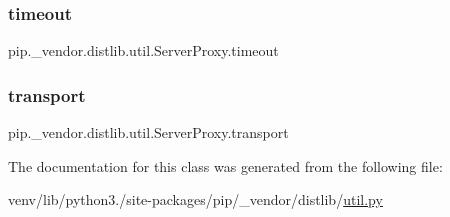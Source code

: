 \subsubsection{\texorpdfstring{timeout}{timeout}}
{\footnotesize\ttfamily pip.\+\_\+vendor.\+distlib.\+util.\+Server\+Proxy.\+timeout}

\mbox{\label{classpip_1_1__vendor_1_1distlib_1_1util_1_1ServerProxy_af8ac17e20f056286f66841bdd371190e}} 
\subsubsection{\texorpdfstring{transport}{transport}}
{\footnotesize\ttfamily pip.\+\_\+vendor.\+distlib.\+util.\+Server\+Proxy.\+transport}



The documentation for this class was generated from the following file\+:\begin{DoxyCompactItemize}
\item 
venv/lib/python3./site-\/packages/pip/\+\_\+vendor/distlib/\hyperlink{pip_2__vendor_2distlib_2util_8py}{util.\+py}\end{DoxyCompactItemize}
